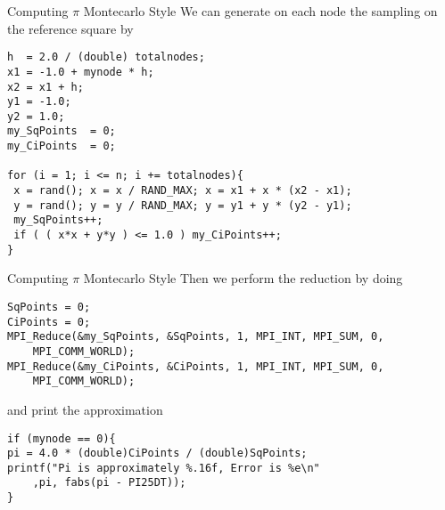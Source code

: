 \documentclass[xcolor={svgnames,usenames}]{beamer}
\begin{document}
\begin{frame}[fragile]{Computing $\pi$ Montecarlo Style}
We can generate on each node the sampling on the reference square by
\begin{verbatim}
h  = 2.0 / (double) totalnodes;
x1 = -1.0 + mynode * h;
x2 = x1 + h;
y1 = -1.0;
y2 = 1.0;
my_SqPoints  = 0;
my_CiPoints  = 0;

for (i = 1; i <= n; i += totalnodes){
 x = rand(); x = x / RAND_MAX; x = x1 + x * (x2 - x1);
 y = rand(); y = y / RAND_MAX; y = y1 + y * (y2 - y1);
 my_SqPoints++;
 if ( ( x*x + y*y ) <= 1.0 ) my_CiPoints++;
}
\end{verbatim}
\end{frame}

\begin{frame}[fragile]{Computing $\pi$ Montecarlo Style}
\small
Then we perform the reduction by doing
\begin{verbatim}
SqPoints = 0;
CiPoints = 0;
MPI_Reduce(&my_SqPoints, &SqPoints, 1, MPI_INT, MPI_SUM, 0,
	MPI_COMM_WORLD);
MPI_Reduce(&my_CiPoints, &CiPoints, 1, MPI_INT, MPI_SUM, 0,
	MPI_COMM_WORLD);
\end{verbatim}
and print the approximation
\begin{verbatim}
if (mynode == 0){
pi = 4.0 * (double)CiPoints / (double)SqPoints;
printf("Pi is approximately %.16f, Error is %e\n"
	,pi, fabs(pi - PI25DT));
}
\end{verbatim}
\end{frame}
\end{document}
